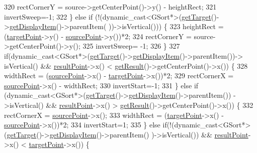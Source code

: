 \begin{DoxyCode}
320             rectCornerY = source->getCenterPoint()->y() - heightRect;
321             invertSweep=-1;
322         \} \textcolor{keywordflow}{else} \textcolor{keywordflow}{if} (!(dynamic\_cast<GSort*>(\hyperlink{classGAction_ac7aff6bc03be3791a8a20a914aae5b2c}{getTarget}()->\hyperlink{classGAction_a5092e3c2bbdd70a63c914766c0142672}{getDisplayItem}()->parentItem(
      ))->isVertical())) \{
323             heightRect = (\hyperlink{classGAction_ad6992ac8b540932c370f5b46c48bbe70}{targetPoint}->y() - \hyperlink{classGAction_adf67bcd561238d7626566cebeee2a151}{sourcePoint}->y())*2;
324             rectCornerY = source->getCenterPoint()->y();
325             invertSweep= -1;
326         \}
327         \textcolor{keywordflow}{if}(dynamic\_cast<GSort*>(\hyperlink{classGAction_ac7aff6bc03be3791a8a20a914aae5b2c}{getTarget}()->\hyperlink{classGAction_a5092e3c2bbdd70a63c914766c0142672}{getDisplayItem}()->parentItem())->
      isVertical() && \hyperlink{classGAction_a08d6b4a2f2d04a46861dafbe38897d8a}{resultPoint}->x() < \hyperlink{classGAction_ae1ed003118c8333c6afa2e8d30e3dc07}{getResult}()->getCenterPoint()->x()) \{
328             widthRect = (\hyperlink{classGAction_adf67bcd561238d7626566cebeee2a151}{sourcePoint}->x() - \hyperlink{classGAction_ad6992ac8b540932c370f5b46c48bbe70}{targetPoint}->x())*2;
329             rectCornerX = \hyperlink{classGAction_adf67bcd561238d7626566cebeee2a151}{sourcePoint}->x() - widthRect;
330             invertStart=-1;
331         \} \textcolor{keywordflow}{else} \textcolor{keywordflow}{if} (dynamic\_cast<GSort*>(\hyperlink{classGAction_ac7aff6bc03be3791a8a20a914aae5b2c}{getTarget}()->\hyperlink{classGAction_a5092e3c2bbdd70a63c914766c0142672}{getDisplayItem}()->parentItem())
      ->isVertical() && \hyperlink{classGAction_a08d6b4a2f2d04a46861dafbe38897d8a}{resultPoint}->x() > \hyperlink{classGAction_ae1ed003118c8333c6afa2e8d30e3dc07}{getResult}()->getCenterPoint()->x()) \{
332             rectCornerX = \hyperlink{classGAction_adf67bcd561238d7626566cebeee2a151}{sourcePoint}->x();
333             widthRect = (\hyperlink{classGAction_ad6992ac8b540932c370f5b46c48bbe70}{targetPoint}->x() - \hyperlink{classGAction_adf67bcd561238d7626566cebeee2a151}{sourcePoint}->x())*2;
334             invertStart=1;
335         \} \textcolor{keywordflow}{else} \textcolor{keywordflow}{if}(!(dynamic\_cast<GSort*>(\hyperlink{classGAction_ac7aff6bc03be3791a8a20a914aae5b2c}{getTarget}()->\hyperlink{classGAction_a5092e3c2bbdd70a63c914766c0142672}{getDisplayItem}()->parentItem()
      )->isVertical()) && \hyperlink{classGAction_a08d6b4a2f2d04a46861dafbe38897d8a}{resultPoint}->x() < \hyperlink{classGAction_ad6992ac8b540932c370f5b46c48bbe70}{targetPoint}->x()) \{

\end{DoxyCode}
